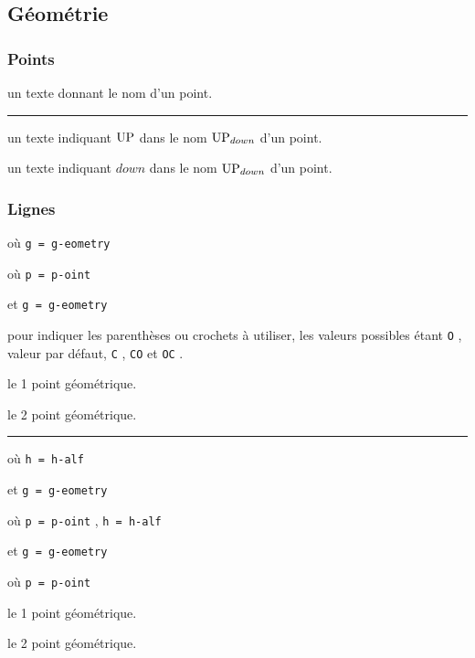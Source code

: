 \documentclass[12pt,a4paper]{article}
\theoremstyle{definition}
\newcommand\separation{
	\medskip
	\hfill\rule{0.5\textwidth}{0.75pt}\hfill
	\medskip
}
\newcommand\extraspace{
	\vspace{0.25em}
}
\newcommand\mwhyprefix[2]{%
	\texttt{#1 = #1-#2}%
}
\newcommand\prefix[1]{%
	\texttt{#1}%
}
\begin{document}
\subsection{Géométrie}

\subsubsection{Points}


\IDarg{} un texte donnant le nom d'un point.


\separation



 un texte indiquant $\pt{UP}$ dans le nom $\pt*{UP}{down}$ d'un point.

 un texte indiquant $down$ dans le nom $\pt*{UP}{down}$ d'un point.





\subsubsection{Lignes}

   où \quad \mwhyprefix{g}{eometry}

  où \quad \mwhyprefix{p}{oint}
                              et \mwhyprefix{g}{eometry}

\IDoption{} pour indiquer les parenthèses ou crochets à utiliser, les valeurs possibles étant \prefix{O}, valeur par défaut, \prefix{C}, \prefix{CO} et \prefix{OC}.

 le 1\ier{} point géométrique.

 le 2\ieme{} point géométrique.


\separation


   où \quad \mwhyprefix{h}{alf}
                             et \mwhyprefix{g}{eometry}

  où \quad \mwhyprefix{p}{oint},
                                \mwhyprefix{h}{alf}
                             et \mwhyprefix{g}{eometry}

\extraspace


  où \quad \mwhyprefix{p}{oint}

 le 1\ier{} point géométrique.

 le 2\ieme{} point géométrique.
\end{document}
